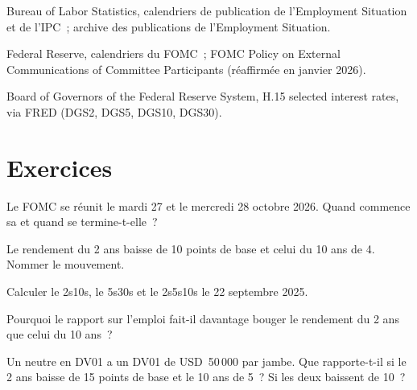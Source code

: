 \begin{omsources}
\item Bureau of Labor Statistics, calendriers de publication de l'Employment Situation
et de l'IPC~; archive des publications de l'Employment Situation.
\item Federal Reserve, calendriers du FOMC~; FOMC Policy on External Communications of Committee
Participants (réaffirmée en janvier 2026). \item Board of Governors of the Federal Reserve System, H.15 selected interest rates, via
FRED (DGS2, DGS5, DGS10, DGS30).
\end{omsources}

\section{Exercices}

\begin{exercise}[$\star$]\label{exo:m2:reading-a-macro-calendar-and-a-rates-screen:1}
Le FOMC se réunit le mardi 27 et le mercredi 28 octobre 2026. Quand commence sa 
et quand se termine-t-elle~?
\end{exercise}

\begin{exercise}[$\star$]\label{exo:m2:reading-a-macro-calendar-and-a-rates-screen:2}
Le rendement du 2 ans baisse de 10 points de base et celui du 10 ans de 4. Nommer le mouvement.
\end{exercise}

\begin{exercise}[$\star$]\label{exo:m2:reading-a-macro-calendar-and-a-rates-screen:3}
Calculer le 2s10s, le 5s30s et le  2s5s10s le 22 septembre 2025.
\end{exercise}

\begin{exercise}[$\star\star$]\label{exo:m2:reading-a-macro-calendar-and-a-rates-screen:4}
Pourquoi le rapport sur l'emploi fait-il davantage bouger le rendement du 2 ans que celui du 10 ans~?
\end{exercise}

\begin{exercise}[$\star\star$]\label{exo:m2:reading-a-macro-calendar-and-a-rates-screen:5}
Un  neutre en DV01 a un DV01 de USD~50\,000 par jambe. Que rapporte-t-il si le 2 ans
baisse de 15 points de base et le 10 ans de 5~? Si les deux baissent de 10~?
\end{exercise}


